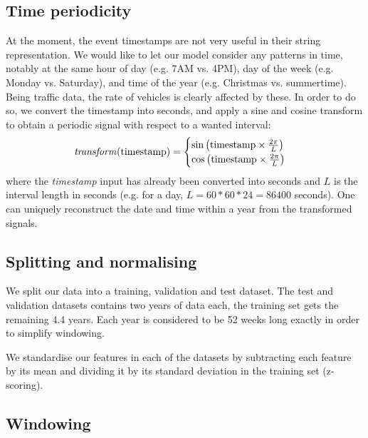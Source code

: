 \documentclass[10pt,conference,compsocconf]{IEEEtran}
\begin{document}
\subsection{Time periodicity}
At the moment, the event timestamps are not very useful in their string representation. We would like to let our model consider any patterns in time, notably at the same hour of day (e.g. 7AM vs. 4PM), day of the week (e.g. Monday vs. Saturday), and time of the year (e.g. Christmas vs. summertime). Being traffic data, the rate of vehicles is clearly affected by these. In order to do so, we convert the timestamp into seconds, and apply a sine and cosine transform to obtain a periodic signal with respect to a wanted interval:
\[ 
\textrm{\textit{transform}(timestamp)} = \begin{cases}
    \sin \left( \textrm{timestamp} \times \frac{2\pi}{L} \right) \\
    \cos \left( \textrm{timestamp} \times \frac{2\pi}{L} \right)
\end{cases}
\]
where the \textit{timestamp} input has already been converted into seconds and $L$ is the interval length in seconds (e.g. for a day, $L=60*60*24=86400$ seconds). One can uniquely reconstruct the date and time within a year from the transformed signals. 

\subsection{Splitting and normalising}

We split our data into a training, validation and test dataset. The test and validation datasets contains two years of data each, the training set gets the remaining 4.4 years. Each year is considered to be 52 weeks long exactly in order to simplify windowing. 

We standardise our features in each of the datasets by subtracting each feature by its mean and dividing it by its standard deviation in the training set (z-scoring). 

\subsection{Windowing}
\end{document}
